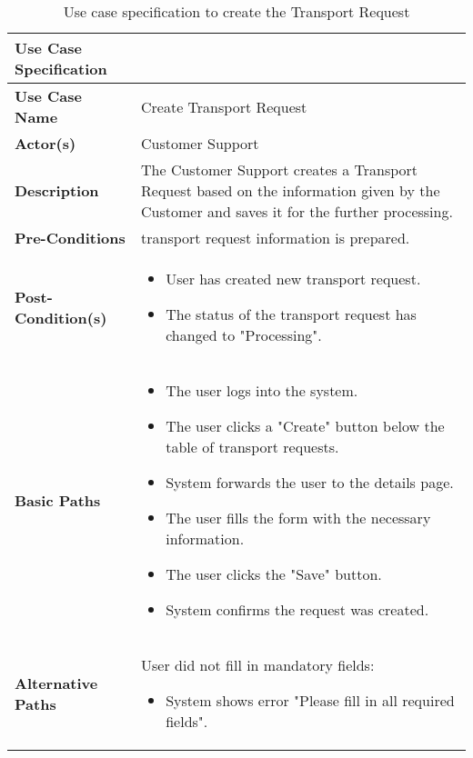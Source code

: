 \documentclass[a4paper]{article}
\begin{document}
    

    \begin{longtable}{|p{}|p{}|}
        \caption{Use case specification to create the Transport Request}
        \label{createTransportRequestUseCase} \\
        \hline
        Use Case Specification  &  \\
         \hline
         \endhead
         \textbf{Use Case Name} & Create Transport Request \\
         \hline
         \textbf{Actor(s)} & Customer Support \\
         \hline
         \textbf{Description} & The Customer Support creates a Transport Request based on the information given by the Customer and saves it for the further processing.  \\
         \hline
         \textbf{Pre-Conditions} & transport request information is prepared. \\
         \hline
        \textbf{Post-Condition(s)} & 
        \begin{itemize}
            \item User has created new transport request.
            \item The status of the transport request has changed to "Processing".
        \end{itemize} \\
         \hline
         \textbf{Basic Paths} & 
         \begin{itemize}
             \item The user logs into the system.
             \item The user clicks a "Create" button below the table of transport requests.
             \item System forwards the user to the details page.
             \item The user fills the form with the necessary information.
             \item The user clicks the "Save" button.
             \item System confirms the request was created.
         \end{itemize} \\
      \hline
      
    \textbf{Alternative Paths} & User did not fill in mandatory fields: 
        \begin{itemize}
            \item System shows error "Please fill in all required fields".
        \end{itemize} \\
        \hline
    \end{longtable}
    
\end{document}
